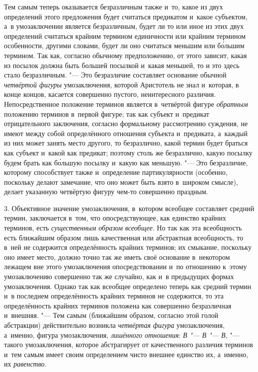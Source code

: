 Тем самым теперь оказывается безразличным также и~то, какое из
двух определений этого предложения будет считаться предикатом и~какое
субъектом, а~в умозаключении является безразличным, будет ли то или иное из
этих двух определений считаться крайним термином единичности или крайним
термином особенности, другими словами, будет ли оно считаться меньшим или
б\'{о}льшим термином. Так как, согласно обычному предположению, от этого
зависит, какая из посылок должна быть большей посылкой и~какая меньшей, то
и это здесь стало безразличным. "--- Это безразличие составляет
основание обычной {\em четвёртой фигуры} умозаключения,
которой Аристотель не знал и~которая,
в конце концов, касается совершенно пустого, неинтересного различия.
Непосредственное положение терминов является в~четвёртой фигуре
{\em обратным} положению
терминов в~первой фигуре; так как субъект и~предикат отрицательного
заключения, согласно формальному рассмотрению суждения, не имеют между
собой определённого отношения субъекта и~предиката, а~каждый из них может
занять место другого, то безразлично, какой термин будет браться как
субъект и~какой как предикат; поэтому столь же безразлично, какую посылку
будем брать как б\'{о}льшую посылку и~какую как меньшую. "---
Это безразличие, которому способствует также и~определение
партикулярности (особенно, поскольку делают замечание, что оно может быть
взято в~широком смысле), делает указанную четвёртую фигуру чем-то
совершенно праздным.

3. Объективное значение умозаключения, в~котором всеобщее
составляет средний термин, заключается в~том, что опосредствующее, как
единство крайних терминов, есть
{\em существенным образом всеобщее}.
Но так как эта всеобщность есть ближайшим образом лишь
качественная или абстрактная всеобщность, то в~ней не содержится
определённость крайних терминов; их смыкание, поскольку оно имеет место,
должно точно так же иметь своё основание в~некотором лежащем вне этого
умозаключения опосредствовании и~по отношению к~этому умозаключению
совершенно так же случайно, как и~в предыдущих формах умозаключения. Однако
так как всеобщее определено теперь как средний термин и~в последнем
определённость крайних терминов не содержится, то эта определённость
крайних терминов положена как совершенно безразличная и~внешняя. "---
Тем самым (ближайшим образом, согласно этой голой
абстракции) действительно возникла
{\em четвёртая фигура}
умозаключения, а~именно, фигура умозаключения,
{\em лишённого отношения}:
{\em В "--- В
"--- В,} "--- такого умозаключения, которое
абстрагирует от качественного различия терминов и~тем самым имеет своим
определением чисто внешнее единство их, а~именно, их
{\em равенство}.

